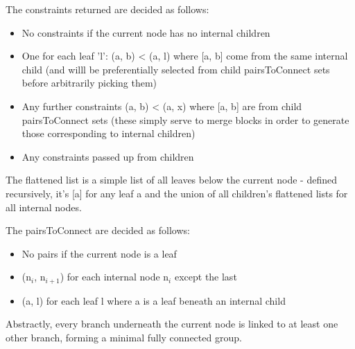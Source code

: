 \documentclass[11pt]{article} %
\begin{document}
The constraints returned are decided as follows:
\begin{itemize}
	\item No constraints if the current node has no internal children
	\item One for each leaf 'l': (a, b) < (a, l) where [a, b] come from the same internal child (and willl be preferentially selected from child pairsToConnect sets before arbitrarily picking them)
	\item Any further constraints (a, b) < (a, x) where [a, b] are from child pairsToConnect sets (these simply serve to merge blocks in order to generate those corresponding to internal children)
	\item Any constraints passed up from children
\end{itemize}

The flattened list is a simple list of all leaves below the current node - defined recursively, it's [a] for any leaf a and the union of all children's flattened lists for all internal nodes.

The pairsToConnect are decided as follows:
\begin{itemize}
	\item No pairs if the current node is a leaf
	\item (n$_i$, n$_{i+1}$) for each internal node n$_i$ except the last
	\item (a, l) for each leaf l where a is a leaf beneath an internal child
\end{itemize}
Abstractly, every branch underneath the current node is linked to at least one other branch, forming a minimal fully connected group. 
\end{document}
